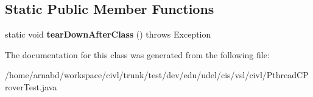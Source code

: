 \subsection*{Static Public Member Functions}
\begin{DoxyCompactItemize}
\item 
\hypertarget{classedu_1_1udel_1_1cis_1_1vsl_1_1civl_1_1PthreadCProverTest_a427dc5a0809383d5a8e3212391c03b85}{}static void {\bfseries tear\+Down\+After\+Class} ()  throws Exception \label{classedu_1_1udel_1_1cis_1_1vsl_1_1civl_1_1PthreadCProverTest_a427dc5a0809383d5a8e3212391c03b85}

\end{DoxyCompactItemize}


The documentation for this class was generated from the following file\+:\begin{DoxyCompactItemize}
\item 
/home/arnabd/workspace/civl/trunk/test/dev/edu/udel/cis/vsl/civl/Pthread\+C\+Prover\+Test.\+java\end{DoxyCompactItemize}
